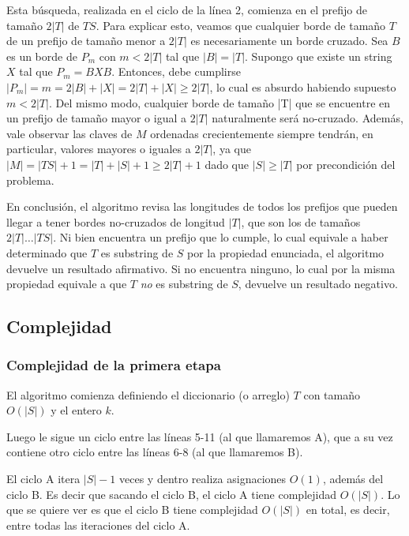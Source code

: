 Esta búsqueda, realizada en el ciclo de la línea 2, comienza en el prefijo de tamaño $2|T|$ de $TS$. Para explicar esto, veamos que cualquier borde de tamaño $T$ de un prefijo de tamaño menor a $2|T|$ es necesariamente un borde cruzado.
\medskip
Sea $B$ es un borde de $P_m$ con $m < 2|T|$ tal que $|B| = |T|$. Supongo que existe un string $X$ tal que $P_m = BXB$. Entonces, debe cumplirse $|P_m| = m = 2|B|+|X| = 2|T| + |X| \geq 2|T|$, lo cual es absurdo habiendo supuesto $m < 2|T|$.
\medskip
Del mismo modo, cualquier borde de tamaño |T| que se encuentre en un prefijo de tamaño mayor o igual a $2|T|$ naturalmente será no-cruzado. Además, vale observar las claves de $M$ ordenadas crecientemente siempre tendrán, en particular, valores mayores o iguales a $2|T|$, ya que $|M| = |TS|+1 = |T|+|S|+1 \geq 2|T| + 1$ dado que $|S| \geq |T|$ por precondición del problema.

En conclusión, el algoritmo revisa las longitudes de todos los prefijos que pueden llegar a tener bordes no-cruzados de longitud $|T|$, que son los de tamaños $2|T| \dots |TS|$. Ni bien encuentra un prefijo que lo cumple, lo cual equivale a haber determinado que $T$ es substring de $S$ por la propiedad enunciada, el algoritmo devuelve un resultado afirmativo. Si no encuentra ninguno, lo cual por la misma propiedad equivale a que $T$ \textit{no} es substring de $S$, devuelve un resultado negativo.
 
\subsection{Complejidad}

\subsubsection{Complejidad de la primera etapa}

El algoritmo comienza definiendo el diccionario (o arreglo) $T$ con tamaño $O(|S|)$ y el entero $k$.

Luego le sigue un ciclo entre las líneas 5-11 (al que llamaremos A), que a su vez contiene otro ciclo
entre las líneas 6-8 (al que llamaremos B).

El ciclo A itera $|S|-1$ veces y dentro realiza asignaciones $O(1)$, además del ciclo B. Es decir que
sacando el ciclo B, el ciclo A tiene complejidad $O(|S|)$. Lo que se quiere ver es que el ciclo B tiene
complejidad $O(|S|)$ en total, es decir, entre todas las iteraciones del ciclo A.

